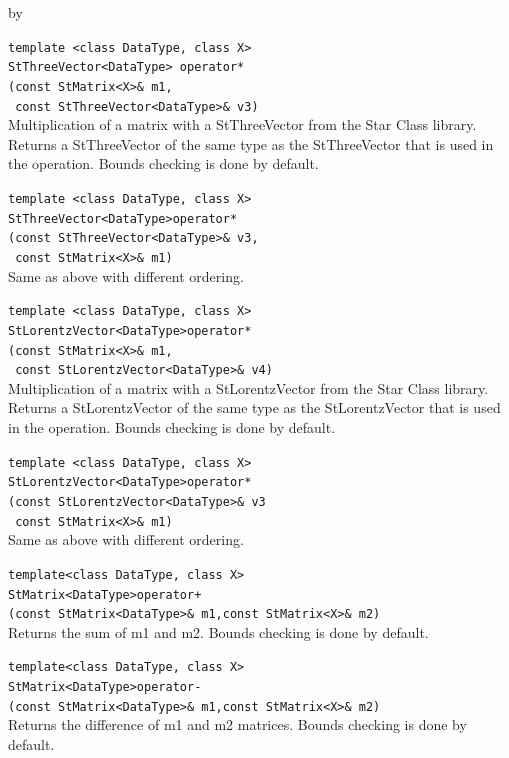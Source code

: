 \documentclass[twoside]{article}
\newcommand{\entrylabel}[1]{\mbox{\textbf{{#1}}}\hfil}%
\newenvironment{entry}
{\begin{list}{}%
    {\renewcommand{\makelabel}{\entrylabel}%
     \setlength{\labelwidth}{90pt}%
     \setlength{\leftmargin}{\labelwidth}
     \advance\leftmargin by \labelsep%
      }%
    }%
  {\end{list}}
\newcommand{\Entrylabel}[1]%
{\raisebox{0pt}[1ex][0pt]{\makebox[\labelwidth][l]%
    {\parbox[t]{\labelwidth}{\hspace{0pt}\textbf{{#1}}}}}}
\newenvironment{Entry}%
{\renewcommand{\entrylabel}{\Entrylabel}\begin{entry}}%
  {\end{entry}}
\begin{document}
\begin{description}
\begin{Entry}
  \verb+template <class DataType, class X>+\\
  \verb+StThreeVector<DataType> operator*+\\
  \verb+(const StMatrix<X>& m1,+\\
  \verb+ const StThreeVector<DataType>& v3)+\\
  Multiplication of a matrix with a StThreeVector from the
  Star Class library.  Returns a StThreeVector of the
  same type as the StThreeVector that is used in the operation.
  Bounds checking is done by default.

  \verb+template <class DataType, class X>+\\
  \verb+StThreeVector<DataType>operator*+\\
  \verb+(const StThreeVector<DataType>& v3,+\\
  \verb+ const StMatrix<X>& m1)+\\
  Same as above with different ordering.
  
  \verb+template <class DataType, class X>+\\
  \verb+StLorentzVector<DataType>operator*+\\
  \verb+(const StMatrix<X>& m1,+\\
  \verb+ const StLorentzVector<DataType>& v4)+\\
  Multiplication of a matrix with a StLorentzVector from the
  Star Class library.  Returns a StLorentzVector of the
  same type as the StLorentzVector that is used in the operation.
  Bounds checking is done by default.

  \verb+template <class DataType, class X>+\\
  \verb+StLorentzVector<DataType>operator*+\\
  \verb+(const StLorentzVector<DataType>& v3+\\
  \verb+ const StMatrix<X>& m1)+\\
  Same as above with different ordering.

  \verb+template<class DataType, class X>+\\
  \verb#StMatrix<DataType>operator+#\\
  \verb#(const StMatrix<DataType>& m1,const StMatrix<X>& m2)#\\
  Returns the sum of m1 and m2.  Bounds checking is
  done by default.

  \verb+template<class DataType, class X>+\\
  \verb+StMatrix<DataType>operator-+\\
  \verb+(const StMatrix<DataType>& m1,const StMatrix<X>& m2)+\\
  Returns the difference of m1 and m2 matrices.  Bounds checking is
  done by default.


\end{Entry}
\end{description}
\end{document}
